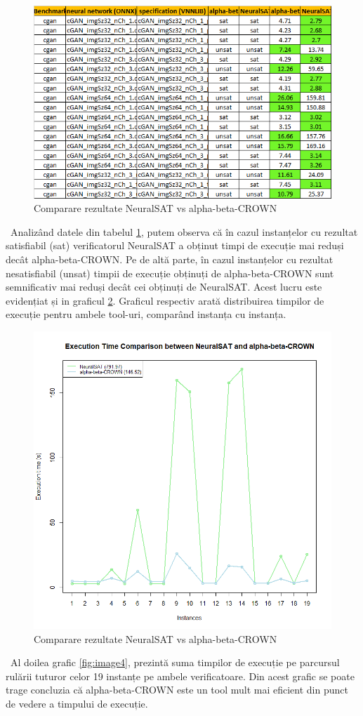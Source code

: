 \begin{figure}[h]
\centering 
\includegraphics[width=0.8\linewidth]{imagini/interpretare rezultate/alpha-beta-CROWN_vs_NeuralSAT.png}
\caption{Comparare rezultate NeuralSAT vs alpha-beta-CROWN}
\label{fig:image2} 
\end{figure}
\
Analizând datele din tabelul \ref{fig:image2}, putem observa că în cazul instanțelor cu rezultat satisfiabil (sat) verificatorul NeuralSAT a obținut timpi de execuție mai reduși  decât alpha-beta-CROWN. Pe de altă parte, în cazul instanțelor cu rezultat nesatisfiabil (unsat) timpii de execuție obținuți de alpha-beta-CROWN sunt semnificativ mai reduși decât cei obținuți de NeuralSAT. Acest lucru este evidențiat și in graficul \ref{fig:image3}. Graficul respectiv arată distribuirea timpilor de execuție pentru ambele tool-uri, comparând instanța cu instanța.



\begin{figure}[h]
\centering 
\includegraphics[width=0.8\linewidth]{imagini/interpretare rezultate/Exec_time_comparison.png}
\caption{Comparare rezultate NeuralSAT vs alpha-beta-CROWN}
\label{fig:image3} 
\end{figure}
\
Al doilea grafic \ref{fig:image4}, prezintă suma timpilor de execuție pe parcursul rulării tuturor celor 19 instanțe pe ambele verificatoare. Din acest grafic se poate trage concluzia că alpha-beta-CROWN este un tool mult mai eficient din punct de vedere a timpului de execuție.

